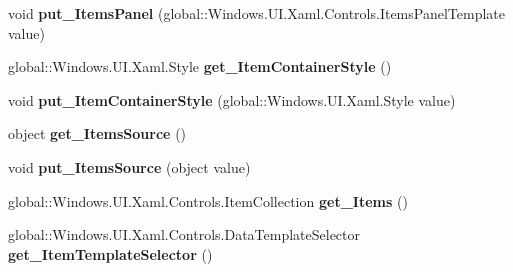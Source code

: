 \begin{DoxyCompactItemize}
\item 
\mbox{\label{interface_windows_1_1_u_i_1_1_xaml_1_1_controls_1_1_i_items_control_af7be75b1cc3df63d782025e03364f6ea}} 
void {\bfseries put\+\_\+\+Items\+Panel} (global\+::\+Windows.\+U\+I.\+Xaml.\+Controls.\+Items\+Panel\+Template value)
\item 
\mbox{\label{interface_windows_1_1_u_i_1_1_xaml_1_1_controls_1_1_i_items_control_a4459707c1f50a2985881f9d3053ab38f}} 
global\+::\+Windows.\+U\+I.\+Xaml.\+Style {\bfseries get\+\_\+\+Item\+Container\+Style} ()
\item 
\mbox{\label{interface_windows_1_1_u_i_1_1_xaml_1_1_controls_1_1_i_items_control_ac812f5bc0cf3f55197783982db3f878d}} 
void {\bfseries put\+\_\+\+Item\+Container\+Style} (global\+::\+Windows.\+U\+I.\+Xaml.\+Style value)
\item 
\mbox{\label{interface_windows_1_1_u_i_1_1_xaml_1_1_controls_1_1_i_items_control_a7f2312123673103e92e3794fabb7c45a}} 
object {\bfseries get\+\_\+\+Items\+Source} ()
\item 
\mbox{\label{interface_windows_1_1_u_i_1_1_xaml_1_1_controls_1_1_i_items_control_ac735d213748166057ef4cbaae62e336e}} 
void {\bfseries put\+\_\+\+Items\+Source} (object value)
\item 
\mbox{\label{interface_windows_1_1_u_i_1_1_xaml_1_1_controls_1_1_i_items_control_a747bf3c87ce3337134354f5d9b743404}} 
global\+::\+Windows.\+U\+I.\+Xaml.\+Controls.\+Item\+Collection {\bfseries get\+\_\+\+Items} ()
\item 
\mbox{\label{interface_windows_1_1_u_i_1_1_xaml_1_1_controls_1_1_i_items_control_ab87924da926fb493c4e9f1d66f5e3327}} 
global\+::\+Windows.\+U\+I.\+Xaml.\+Controls.\+Data\+Template\+Selector {\bfseries get\+\_\+\+Item\+Template\+Selector} ()
\item 

\end{DoxyCompactItemize}

